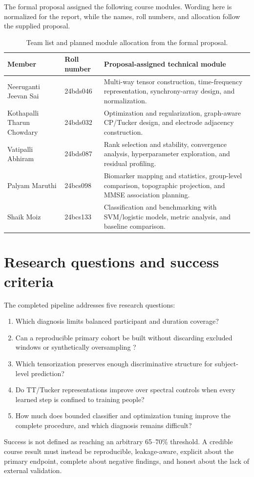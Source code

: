 The formal proposal assigned the following course modules. Wording here is
normalized for the report, while the names, roll numbers, and allocation follow
the supplied proposal.

\begin{table}[htbp]
\centering
\small
\begin{tabularx}{\textwidth}{p{}p{}X}
\toprule
\textbf{Member} & \textbf{Roll number} & \textbf{Proposal-assigned technical module}\\
\midrule
Neeruganti Jeevan Sai & 24bds046 & Multi-way tensor construction, time-frequency representation, synchrony-array design, and normalization.\\
Kothapalli Tharun Chowdary & 24bds032 & Optimization and regularization, graph-aware CP/Tucker design, and electrode adjacency construction.\\
Vatipalli Abhiram & 24bds087 & Rank selection and stability, convergence analysis, hyperparameter exploration, and residual profiling.\\
Palyam Maruthi & 24bcs098 & Biomarker mapping and statistics, group-level comparison, topographic projection, and MMSE association planning.\\
Shaik Moiz & 24bcs133 & Classification and benchmarking with SVM/logistic models, metric analysis, and baseline comparison.\\
\bottomrule
\end{tabularx}
\caption{Team list and planned module allocation from the formal proposal.}
\label{tab:team}
\end{table}

\section{Research questions and success criteria}

The completed pipeline addresses five research questions:

\begin{enumerate}
  \item Which diagnosis limits balanced participant and duration coverage?
  \item Can a reproducible primary cohort be built without discarding excluded
  windows or synthetically oversampling \FTD{}?
  \item Which tensorization preserves enough discriminative structure for
  subject-level prediction?
  \item Do TT/Tucker representations improve over spectral controls when every
  learned step is confined to training people?
  \item How much does bounded classifier and optimization tuning improve the
  complete procedure, and which diagnosis remains difficult?
\end{enumerate}

Success is not defined as reaching an arbitrary 65--70\% threshold. A credible
course result must instead be reproducible, leakage-aware, explicit about the
primary endpoint, complete about negative findings, and honest about the lack of
external validation.

